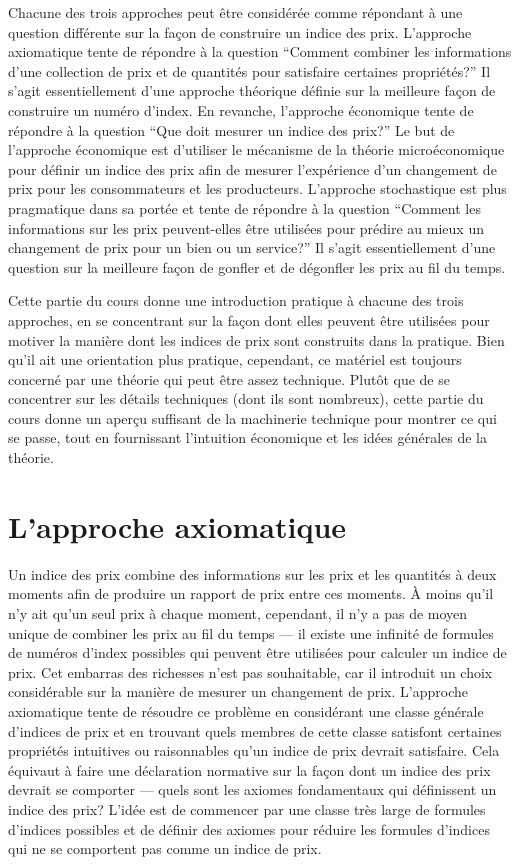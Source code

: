 \documentclass[
]{article}
\begin{document}
Chacune des trois approches peut être considérée comme répondant à une question différente sur la façon de construire un indice des prix. L'approche axiomatique tente de répondre à la question ``Comment combiner les informations d'une collection de prix et de quantités pour satisfaire certaines propriétés?'' Il s'agit essentiellement d'une approche théorique définie sur la meilleure façon de construire un numéro d'index. En revanche, l'approche économique tente de répondre à la question ``Que doit mesurer un indice des prix?'' Le but de l'approche économique est d'utiliser le mécanisme de la théorie microéconomique pour définir un indice des prix afin de mesurer l'expérience d'un changement de prix pour les consommateurs et les producteurs. L'approche stochastique est plus pragmatique dans sa portée et tente de répondre à la question ``Comment les informations sur les prix peuvent-elles être utilisées pour prédire au mieux un changement de prix pour un bien ou un service?'' Il s'agit essentiellement d'une question sur la meilleure façon de gonfler et de dégonfler les prix au fil du temps.

Cette partie du cours donne une introduction pratique à chacune des trois approches, en se concentrant sur la façon dont elles peuvent être utilisées pour motiver la manière dont les indices de prix sont construits dans la pratique. Bien qu'il ait une orientation plus pratique, cependant, ce matériel est toujours concerné par une théorie qui peut être assez technique. Plutôt que de se concentrer sur les détails techniques (dont ils sont nombreux), cette partie du cours donne un aperçu suffisant de la machinerie technique pour montrer ce qui se passe, tout en fournissant l'intuition économique et les idées générales de la théorie.

\hypertarget{lapproche-axiomatique}{%
\section{L'approche axiomatique}\label{lapproche-axiomatique}}

Un indice des prix combine des informations sur les prix et les quantités à deux moments afin de produire un rapport de prix entre ces moments. À moins qu'il n'y ait qu'un seul prix à chaque moment, cependant, il n'y a pas de moyen unique de combiner les prix au fil du temps --- il existe une infinité de formules de numéros d'index possibles qui peuvent être utilisées pour calculer un indice de prix. Cet embarras des richesses n'est pas souhaitable, car il introduit un choix considérable sur la manière de mesurer un changement de prix. L'approche axiomatique tente de résoudre ce problème en considérant une classe générale d'indices de prix et en trouvant quels membres de cette classe satisfont certaines propriétés intuitives ou raisonnables qu'un indice de prix devrait satisfaire. Cela équivaut à faire une déclaration normative sur la façon dont un indice des prix devrait se comporter --- quels sont les axiomes fondamentaux qui définissent un indice des prix? L'idée est de commencer par une classe très large de formules d'indices possibles et de définir des axiomes pour réduire les formules d'indices qui ne se comportent pas comme un indice de prix.
\end{document}

